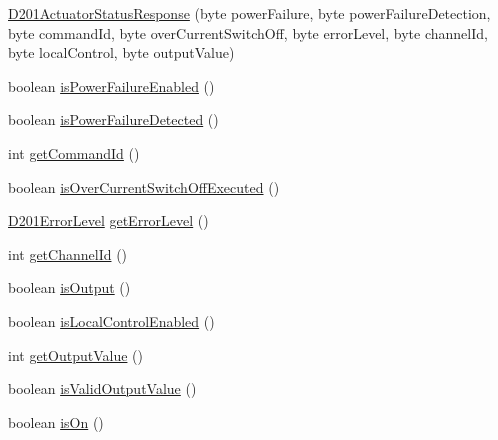 \begin{DoxyCompactItemize}
\item 
\hyperlink{classit_1_1polito_1_1elite_1_1enocean_1_1enj_1_1eep_1_1eep26_1_1_d2_1_1_d201_1_1_d201_actuator_status_response_aac9599b9ce44ed2b6a18e91df154c816}{D201\+Actuator\+Status\+Response} (byte power\+Failure, byte power\+Failure\+Detection, byte command\+Id, byte over\+Current\+Switch\+Off, byte error\+Level, byte channel\+Id, byte local\+Control, byte output\+Value)
\item 
boolean \hyperlink{classit_1_1polito_1_1elite_1_1enocean_1_1enj_1_1eep_1_1eep26_1_1_d2_1_1_d201_1_1_d201_actuator_status_response_a8435410dbffddbc9f0c258fb08571ba3}{is\+Power\+Failure\+Enabled} ()
\item 
boolean \hyperlink{classit_1_1polito_1_1elite_1_1enocean_1_1enj_1_1eep_1_1eep26_1_1_d2_1_1_d201_1_1_d201_actuator_status_response_aff11281158ddcdd1072141ebec2103dd}{is\+Power\+Failure\+Detected} ()
\item 
int \hyperlink{classit_1_1polito_1_1elite_1_1enocean_1_1enj_1_1eep_1_1eep26_1_1_d2_1_1_d201_1_1_d201_actuator_status_response_a1dd554285f71f0a49b3609774243222d}{get\+Command\+Id} ()
\item 
boolean \hyperlink{classit_1_1polito_1_1elite_1_1enocean_1_1enj_1_1eep_1_1eep26_1_1_d2_1_1_d201_1_1_d201_actuator_status_response_a1d68073c9a89d5472c10f51c4caf5d2c}{is\+Over\+Current\+Switch\+Off\+Executed} ()
\item 
\hyperlink{enumit_1_1polito_1_1elite_1_1enocean_1_1enj_1_1eep_1_1eep26_1_1_d2_1_1_d201_1_1_d201_error_level}{D201\+Error\+Level} \hyperlink{classit_1_1polito_1_1elite_1_1enocean_1_1enj_1_1eep_1_1eep26_1_1_d2_1_1_d201_1_1_d201_actuator_status_response_acc9c65f556711f5a61f3f4720aceccbc}{get\+Error\+Level} ()
\item 
int \hyperlink{classit_1_1polito_1_1elite_1_1enocean_1_1enj_1_1eep_1_1eep26_1_1_d2_1_1_d201_1_1_d201_actuator_status_response_a7c74a1a0d2329a330f99c9c4176e3a42}{get\+Channel\+Id} ()
\item 
boolean \hyperlink{classit_1_1polito_1_1elite_1_1enocean_1_1enj_1_1eep_1_1eep26_1_1_d2_1_1_d201_1_1_d201_actuator_status_response_a0d7fbd695432f0a0554b73ac043834a9}{is\+Output} ()
\item 
boolean \hyperlink{classit_1_1polito_1_1elite_1_1enocean_1_1enj_1_1eep_1_1eep26_1_1_d2_1_1_d201_1_1_d201_actuator_status_response_a7b19ac05f862df821f64ea1c9186ecf3}{is\+Local\+Control\+Enabled} ()
\item 
int \hyperlink{classit_1_1polito_1_1elite_1_1enocean_1_1enj_1_1eep_1_1eep26_1_1_d2_1_1_d201_1_1_d201_actuator_status_response_a2e1c6ba08f17cf99eb0095216e9a6537}{get\+Output\+Value} ()
\item 
boolean \hyperlink{classit_1_1polito_1_1elite_1_1enocean_1_1enj_1_1eep_1_1eep26_1_1_d2_1_1_d201_1_1_d201_actuator_status_response_a4bbde15a318d004a1bbb8f6ed8df8bc9}{is\+Valid\+Output\+Value} ()
\item 
boolean \hyperlink{classit_1_1polito_1_1elite_1_1enocean_1_1enj_1_1eep_1_1eep26_1_1_d2_1_1_d201_1_1_d201_actuator_status_response_aef02f3f877264da1f835e7096b2b2717}{is\+On} ()
\end{DoxyCompactItemize}


